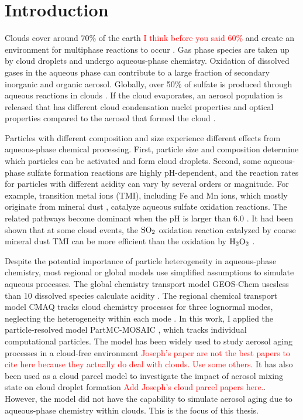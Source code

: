 \documentclass[edeposit,fullpage]{uiucthesis2009}
\begin{document}
\label{chap2:mon}
\section{Introduction}

Clouds cover around 70$\%$ of the earth \citep{Stubenrauch2013}
\textcolor{red}{I think before you said 60\%} and create an
environment for multiphase reactions to occur
\citep{Deguillaume2005}. Gas phase species are taken up by cloud
droplets and undergo aqueous-phase chemistry. Oxidation of dissolved
gases in the aqueous phase can contribute to a large fraction of
secondary inorganic and organic aerosol. Globally, over 50\% of
sulfate is produced through aqueous reactions in clouds
\citep{Philip2014, Roth2016}. If the cloud evaporates, an aerosol
population is released that has different cloud condensation nuclei
properties and optical properties compared to the aerosol that formed
the cloud \citep{Farmer2015, Henning2014}.

Particles with different composition and size experience different
effects from aqueous-phase chemical processing. First, particle size
and composition determine which particles can be activated and form
cloud droplets. Second, some aqueous-phase sulfate formation reactions
are highly pH-dependent, and the reaction rates for particles with
different acidity can vary by several orders or magnitude. For
example, transition metal ions (TMI), including Fe and Mn ions, which
mostly originate from mineral dust \citep{alexander2009transition},
catalyze aqueous sulfate oxidation reactions. The related pathways
become dominant when the pH is larger than 6.0
\citep{Seinfeld2006a}. It had been shown that at some cloud events,
the $\rm SO_2$ oxidation reaction catalyzed by coarse mineral dust TMI
can be more efficient than the oxidation by $\rm H_2O_2$
\citep{Harris2013a, Harris2014}.

Despite the potential importance of particle heterogeneity in
aqueous-phase chemistry, most regional or global models use simplified
assumptions to simulate aqueous processes. The global chemistry
transport model GEOS-Chem usesless than 10 dissolved species calculate
acidity \citep{alexander2012isotopic}. The regional chemical transport
model CMAQ tracks cloud chemistry processes for three lognormal modes,
neglecting the heterogeneity within each mode
\citep{fahey2017framework}. In this work, I applied the
particle-resolved model PartMC-MOSAIC \citep{Riemer2009, Zaveri2010a},
which tracks individual computational particles. The model has been
widely used to study aerosol aging processes in a cloud-free
environment \citep{ching2012impacts, Ching2016}
\textcolor{red}{Joseph's paper are not the best papers to cite here
  because they actually do deal with clouds. Use some others}. It has
also been used as a cloud parcel model to investigate the impact of
aerosol mixing state on cloud droplet formation \textcolor{red}{Add
  Joseph's cloud parcel papers here.}. However, the model did not have
the capability to simulate aerosol aging due to aqueous-phase
chemistry within clouds. This is the focus of this thesis.
\end{document}
